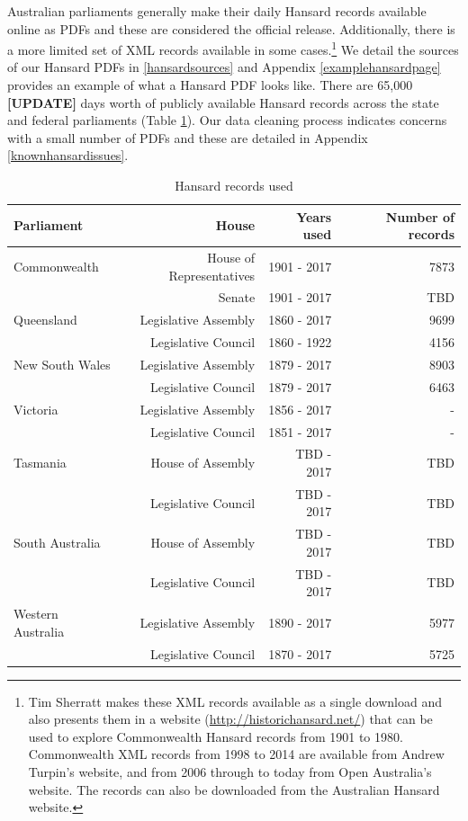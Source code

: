 \documentclass[12pt,]{article}
\theoremstyle{definition}
\theoremstyle{definition}
\theoremstyle{definition}
\theoremstyle{remark}
\begin{document}
Australian parliaments generally make their daily Hansard records
available online as PDFs and these are considered the official release.
Additionally, there is a more limited set of XML records available in
some cases.\footnote{Tim Sherratt makes these XML records available as a
  single download and also presents them in a website
  (\url{http://historichansard.net/}) that can be used to explore
  Commonwealth Hansard records from 1901 to 1980. Commonwealth XML
  records from 1998 to 2014 are available from Andrew Turpin's website,
  and from 2006 through to today from Open Australia's website. The
  records can also be downloaded from the Australian Hansard website.}
We detail the sources of our Hansard PDFs in \ref{hansardsources} and
Appendix \ref{examplehansardpage} provides an example of what a Hansard
PDF looks like. There are 65,000 \textbf{{[}UPDATE{]}} days worth of
publicly available Hansard records across the state and federal
parliaments (Table \ref{tab:yearsusedtable}). Our data cleaning process
indicates concerns with a small number of PDFs and these are detailed in
Appendix \ref{knownhansardissues}.

\begin{table}

\caption{\label{tab:yearsusedtable}Hansard records used}
\centering
\fontsize{12}{14}\selectfont
\begin{tabular}[t]{lrrr}
\toprule
Parliament & House & Years used & Number of records\\
\midrule
Commonwealth & House of Representatives & 1901 - 2017 & 7873\\
 & Senate & 1901 - 2017 & TBD\\
Queensland & Legislative Assembly & 1860 - 2017 & 9699\\
 & Legislative Council & 1860 - 1922 & 4156\\
New South Wales & Legislative Assembly & 1879 - 2017 & 8903\\
\addlinespace
 & Legislative Council & 1879 - 2017 & 6463\\
Victoria & Legislative Assembly & 1856 - 2017 & -\\
 & Legislative Council & 1851 - 2017 & -\\
Tasmania & House of Assembly & TBD - 2017 & TBD\\
 & Legislative Council & TBD - 2017 & TBD\\
\addlinespace
South Australia & House of Assembly & TBD - 2017 & TBD\\
 & Legislative Council & TBD - 2017 & TBD\\
Western Australia & Legislative Assembly & 1890 - 2017 & 5977\\
 & Legislative Council & 1870 - 2017 & 5725\\
\bottomrule
\end{tabular}
\end{table}
\end{document}
